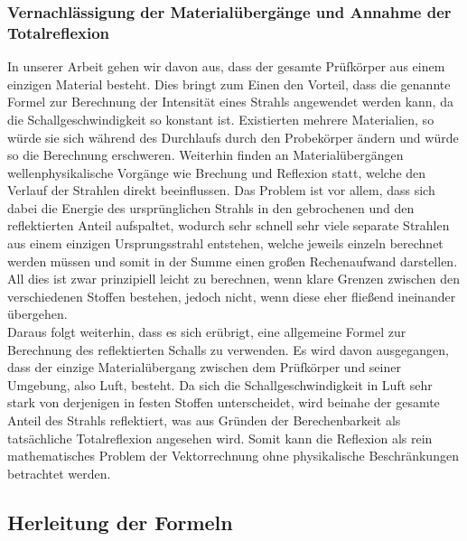 \documentclass[reducespace,stylepage,semiarbeit]{spezidoc}
\begin{document}
\subsubsection{Vernachlässigung der Materialübergänge und Annahme der Totalreflexion}
In unserer Arbeit gehen wir davon aus, dass der gesamte Prüfkörper aus einem einzigen Material besteht. 
Dies bringt zum Einen den Vorteil, dass die genannte Formel zur Berechnung der Intensität eines Strahls angewendet werden kann, da die Schallgeschwindigkeit so konstant ist. 
Existierten mehrere Materialien, so würde sie sich während des Durchlaufs durch den Probekörper ändern und würde so die Berechnung erschweren. 
Weiterhin finden an Materialübergängen wellenphysikalische Vorgänge wie Brechung und Reflexion statt, welche den Verlauf der Strahlen direkt beeinflussen. 
Das Problem ist vor allem, dass sich dabei die Energie des ursprünglichen Strahls in den gebrochenen und den reflektierten Anteil aufspaltet, wodurch sehr schnell sehr viele separate Strahlen aus einem einzigen Ursprungsstrahl entstehen, welche jeweils einzeln berechnet werden müssen und somit in der Summe einen großen Rechenaufwand darstellen. 
All dies ist zwar prinzipiell leicht zu berechnen, wenn klare Grenzen zwischen den verschiedenen Stoffen bestehen, jedoch nicht, wenn diese eher \glqq fließend\grqq{} ineinander übergehen.\\
Daraus folgt weiterhin, dass es sich erübrigt, eine allgemeine Formel zur Berechnung des reflektierten Schalls zu verwenden. 
Es wird davon ausgegangen, dass der einzige Materialübergang zwischen dem Prüfkörper und seiner Umgebung, also Luft, besteht. 
Da sich die Schallgeschwindigkeit in Luft sehr stark von derjenigen in festen Stoffen unterscheidet, wird beinahe der gesamte Anteil des Strahls reflektiert, was aus Gründen der Berechenbarkeit als tatsächliche Totalreflexion angesehen wird. 
Somit kann die Reflexion als rein mathematisches Problem der Vektorrechnung ohne physikalische Beschränkungen betrachtet werden.

\subsection{Herleitung der Formeln}\label{sec:herleitung}

\end{document}
